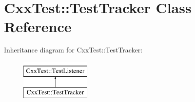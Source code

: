 \hypertarget{classCxxTest_1_1TestTracker}{\section{Cxx\-Test\-:\-:Test\-Tracker Class Reference}
\label{classCxxTest_1_1TestTracker}
}
Inheritance diagram for Cxx\-Test\-:\-:Test\-Tracker\-:\begin{figure}[H]
\begin{center}
\leavevmode
\includegraphics[height=2.000000cm]{classCxxTest_1_1TestTracker}
\end{center}
\end{figure}
